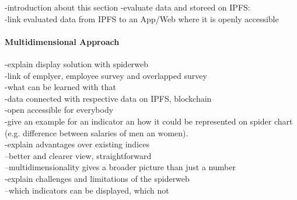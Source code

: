 -introduction about this section
-evaluate data and storeed on IPFS:\\
-link evaluated data from IPFS to an App/Web where it is openly accessible
\paragraph*{Multidimensional Approach}


-explain display solution with spiderweb\\
-link of emplyer, employee survey and overlapped survey\\
-what can be learned with that\\
-data connected with respective data on IPFS, blockchain\\
-open accessible for everybody\\
-give an example for an indicator an how it could be represented on spider chart (e.g. difference between salaries of men an women).\\
-explain advantages over existing indices\\
--better and clearer view, straightforward\\
--multidimensionality gives a broader picture than just a number\\
-explain challenges and limitations of the spiderweb\\
--which indicators can be displayed, which not\\
		